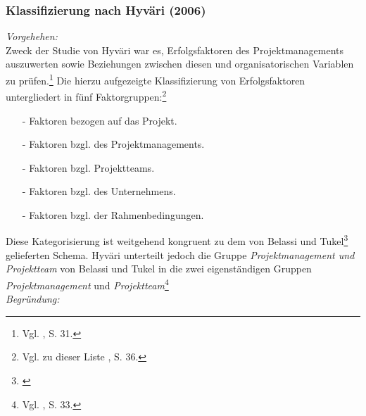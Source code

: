 \noindent
\subsubsection{Klassifizierung nach Hyväri (2006)}
\textit{Vorgehehen:}\\\noindent
Zweck der Studie von Hyväri war es, Erfolgsfaktoren des Projektmanagements 
auszuwerten sowie Beziehungen zwischen diesen und organisatorischen Variablen zu prüfen.\footnote{Vgl. \cite{Hyvari.2006}, S. 31.}
Die hierzu aufgezeigte Klassifizierung von Erfolgsfaktoren untergliedert in fünf Faktorgruppen:\footnote{Vgl. zu dieser Liste \cite{Hyvari.2006}, S. 36.}
\begin{itemize}\itemsep0pt
\item[-]Faktoren bezogen auf das Projekt.
\item[-]Faktoren bzgl. des Projektmanagements.
\item[-]Faktoren bzgl. Projektteams.
\item[-]Faktoren bzgl. des Unternehmens.
\item[-]Faktoren bzgl. der Rahmenbedingungen.
\end{itemize}
Diese Kategorisierung ist weitgehend kongruent zu dem von Belassi und Tukel\footnote{\cite{Belassi.1996}} gelieferten Schema. Hyväri unterteilt
jedoch die Gruppe \textit{Projektmanagement und Projektteam} von Belassi und Tukel in die zwei eigenständigen 
Gruppen \textit{Projektmanagement} und \textit{Projektteam}\footnote{Vgl. \cite{Hyvari.2006}, S. 33.}\\
\noindent\textit{Begründung:}\\\noindent



